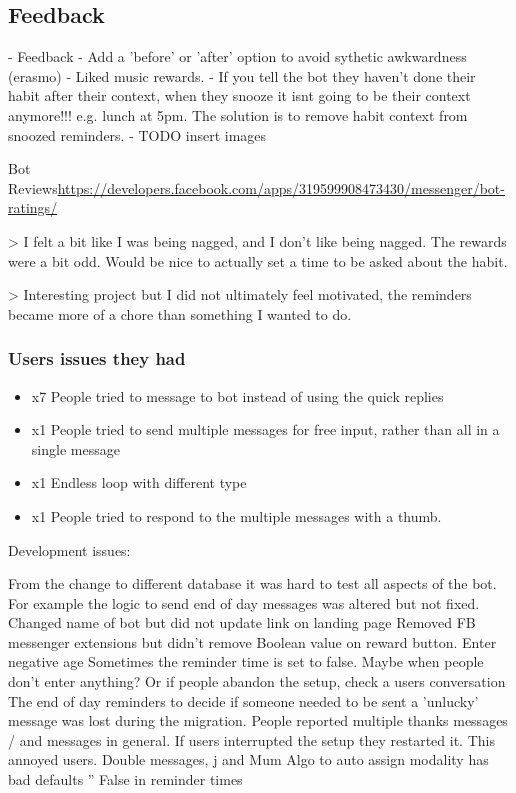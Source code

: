 \subsection{Feedback}

- Feedback
  - Add a 'before' or 'after' option to avoid sythetic awkwardness (erasmo)
  - Liked music rewards.
  - If you tell the bot they haven't done their habit after their context, when they snooze it isnt going to be their context anymore!!! e.g. lunch at 5pm. The solution is to remove habit context from snoozed reminders.
  - TODO insert images\newline

Bot Reviews\url{https://developers.facebook.com/apps/319599908473430/messenger/bot-ratings/}


> I felt a bit like I was being nagged, and I don't like being nagged. The rewards were a bit odd. Would be nice to actually set a time to be asked about the habit.

> Interesting project but I did not ultimately feel motivated, the reminders became more of a chore than something I wanted to do.


\subsubsection*{Users issues they had}

\begin{itemize}
  \item x7 People tried to message to bot instead of using the quick replies
  \item x1 People tried to send multiple messages for free input, rather than all in a single message
  \item x1 Endless loop with different type
  \item x1 People tried to respond to the multiple messages with a thumb.
\end{itemize}

Development issues:

From the change to different database it was hard to test all aspects of the bot. For example the logic to send end of day messages was altered but not fixed.
Changed name of bot but did not update link on landing page
Removed FB messenger extensions but didn't remove Boolean value on reward button.
Enter negative age
Sometimes the reminder time is set to false. Maybe when people don't enter anything? Or if people abandon the setup, check a users conversation
The end of day reminders to decide if someone needed to be sent a 'unlucky' message was lost during the migration.
People reported multiple thanks messages / and messages in general.
If users interrupted the setup they restarted it. This annoyed users.
Double messages, j and Mum
Algo to auto assign modality has bad defaults ''
False in reminder times


